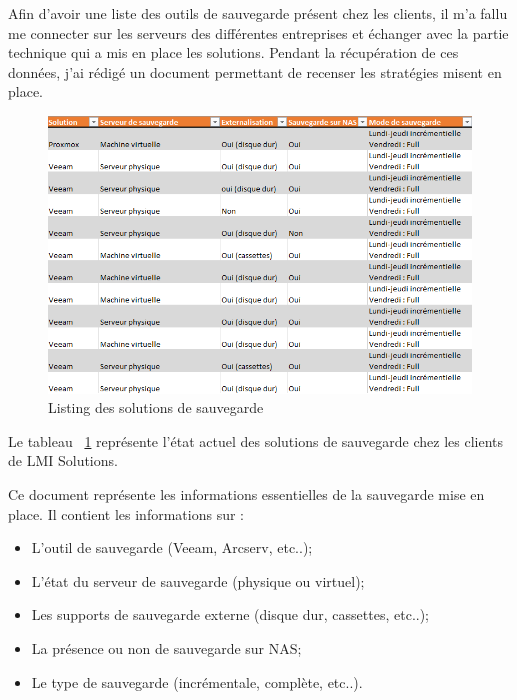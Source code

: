 \documentclass[pfe]{tnreport} %
\begin{document}
Afin d'avoir une liste des outils de sauvegarde présent chez les clients, il m'a fallu me connecter sur les serveurs des différentes entreprises et échanger avec la partie technique qui a mis en place les solutions. \newline
Pendant la récupération de ces données, j'ai rédigé un document permettant de recenser les stratégies misent en place. \newline
\begin{figure}[ht]
 \centering
 \includegraphics[width=17cm]{figures/etatclient.png}
 \caption{Listing des solutions de sauvegarde}
 \label{fig:etatclient}
\end{figure}

Le tableau ~\ref{fig:etatclient} représente l'état actuel des solutions de sauvegarde chez les clients de LMI Solutions.

Ce document représente les informations essentielles de la sauvegarde mise en place. \newline Il contient les informations sur : \newline
\begin{itemize}
 \item L'outil de sauvegarde (Veeam, Arcserv, etc..);
 \item L'état du serveur de sauvegarde (physique ou virtuel);
 \item Les supports de sauvegarde externe (disque dur, cassettes, etc..);
 \item La présence ou non de sauvegarde sur NAS;
 \item Le type de sauvegarde (incrémentale, complète, etc..).\newline
\end{itemize} 
\end{document}
